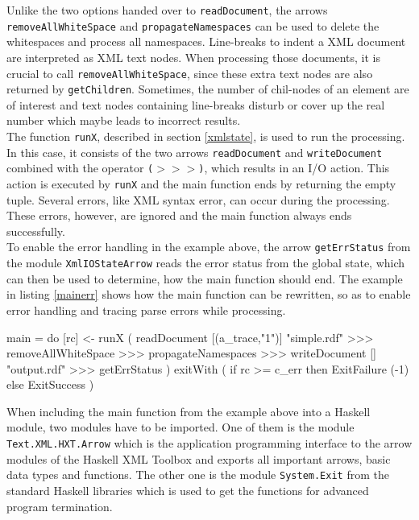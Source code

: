 \documentclass[11pt,a4paper,headsepline, bibtotoc]{scrreprt}
\begin{document}
Unlike the two options handed over to \texttt{readDocument}, the arrows \texttt{removeAllWhiteSpace} and \texttt{propagateNamespaces} can be used to delete the whitespaces and process all namespaces. Line-breaks to indent a XML document are interpreted as XML text nodes. When processing those documents, it is crucial to call \texttt{removeAllWhiteSpace}, since these extra text nodes are also returned by \texttt{getChildren}. Sometimes, the number of chil-nodes of an element are of interest and text nodes containing line-breaks disturb or cover up the real number which maybe leads to incorrect results.\\
The function \texttt{runX}, described in section \ref{xmlstate}, is used to run the processing. In this case, it consists of the two arrows  \texttt{readDocument} and \texttt{writeDocument} combined with the operator {\tt ($>$$>$$>$)}, which results in an I/O action. This action is executed by \texttt{runX} and the main function ends by returning the empty tuple. Several errors, like XML syntax error, can occur during the processing. These errors, however, are ignored and the main function always ends successfully.\\
To enable the error handling in the example above, the arrow \texttt{getErrStatus} from the module \texttt{XmlIOStateArrow} reads the error status from the global state, which can then be used to determine, how the main function should end. The example in listing \ref{mainerr} shows how the main function can be rewritten, so as to enable error handling and tracing parse errors while processing.
\begin{code}[caption=Main Function with Error Handling,label=mainerr]
main
  = do
    [rc] <- runX ( readDocument [(a_trace,"1")] 
                                "simple.rdf"
                   >>>
                   removeAllWhiteSpace >>> propagateNamespaces
                   >>>
                   writeDocument [] "output.rdf"
                   >>>
                   getErrStatus
                 )
    exitWith ( if rc >= c_err
               then ExitFailure (-1)
               else ExitSuccess )
\end{code}
When including the main function from the example above into a Haskell module, two modules have to be imported. One of them is the module \texttt{Text.XML.HXT.Arrow} which is the application programming interface to the arrow modules of the Haskell XML Toolbox and exports all important arrows, basic data types and functions. The other one is the module \texttt{System.Exit} from the standard Haskell libraries which is used to get the functions for advanced program termination.\\
\end{document}
